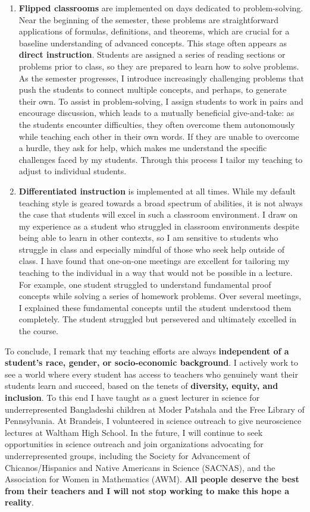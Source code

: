 \documentclass[a4paper,11pt]{article}
\begin{document}
\begin{enumerate}
	\item \textbf{Flipped classrooms} are implemented on days dedicated to problem-solving. Near the beginning of the semester, these problems are straightforward applications of formulas, definitions, and theorems, which are crucial for a baseline understanding of advanced concepts. This stage often appears as \textbf{direct instruction}. Students are assigned a series of reading sections or problems prior to class, so they are prepared to learn how to solve problems. As the semester progresses, I introduce increasingly challenging problems that push the students to connect multiple concepts, and perhaps, to generate their own. To assist in problem-solving, I assign students to work in pairs and encourage discussion, which leads to a mutually beneficial give-and-take: as the students encounter difficulties, they often overcome them autonomously while teaching each other in their own words. If they are unable to overcome a hurdle, they ask for help, which makes me understand the specific challenges faced by my students. Through this process I tailor my teaching to adjust to individual students. 
	
	\item \textbf{Differentiated instruction} is implemented at all times. While my default teaching style is geared towards a broad spectrum of abilities, it is not always the case that students will excel in such a classroom environment. I draw on my experience as a student who struggled in classroom environments despite being able to learn in other contexts, so I am sensitive to students who struggle in class and especially mindful of those who seek help outside of class. I have found that one-on-one meetings are excellent for tailoring my teaching to the individual in a way that would not be possible in a lecture. For example, one student struggled to understand fundamental proof concepts while solving a series of homework problems. Over several meetings, I explained these fundamental concepts until the student understood them completely. The student struggled but persevered and ultimately excelled in the course.
\end{enumerate}

To conclude, I remark that my teaching efforts are always \textbf{independent of a student's race, gender, or socio-economic background}. I actively work to see a world where every student has access to teachers who genuinely want their students learn and succeed, based on the tenets of \textbf{diversity, equity, and inclusion}. To this end I have taught as a guest lecturer in science for underrepresented Bangladeshi children at Moder Patshala and the Free Library of Pennsylvania. At Brandeis, I volunteered in science outreach to give neuroscience lectures at Waltham High School. In the future, I will continue to seek opportunities in science outreach and join organizations advocating for underrepresented groups, including the Society for Advancement of Chicanos/Hispanics and Native Americans in Science (SACNAS), and the Association for Women in Mathematics (AWM). \textbf{All people deserve the best from their teachers and I will not stop working to make this hope a reality}.
\end{document}
